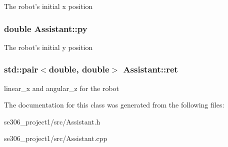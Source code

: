 The robot's initial x position \hypertarget{classAssistant_ae092b444c226b5ffbdf454ad24f630d6}{
\subsubsection[{py}]{\setlength{\rightskip}{0pt plus 5cm}double Assistant\-::py\hspace{0.3cm}{\ttfamily [protected]}}}\label{classAssistant_ae092b444c226b5ffbdf454ad24f630d6}
The robot's initial y position \hypertarget{classAssistant_a741527493a17d0f6dc512c03a2055fc1}{
\subsubsection[{ret}]{\setlength{\rightskip}{0pt plus 5cm}std\-::pair$<$double, double$>$ Assistant\-::ret\hspace{0.3cm}{\ttfamily [protected]}}}\label{classAssistant_a741527493a17d0f6dc512c03a2055fc1}
linear\-\_\-x and angular\-\_\-z for the robot 

The documentation for this class was generated from the following files\-:\begin{DoxyCompactItemize}
\item 
se306\-\_\-project1/src/Assistant.\-h\item 
se306\-\_\-project1/src/Assistant.\-cpp\end{DoxyCompactItemize}
